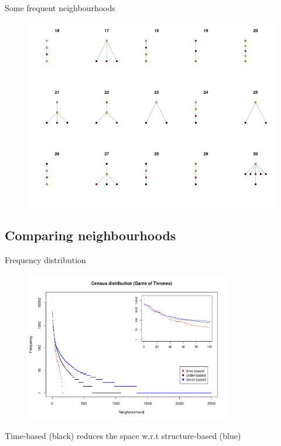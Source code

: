 \documentclass{beamer}
\begin{document}
\begin{frame}{Some frequent neighbourhoods}{}
	\begin{figure}
		\centering
		\includegraphics[width=1\textwidth]{dictionary2}
	\end{figure}
\end{frame}

\subsection{Comparing neighbourhoods}
\begin{frame}{Frequency distribution}{}
	\begin{figure}
		\centering
		\includegraphics[width=0.8\textwidth]{compare_census_distribution}
	\end{figure}
Time-based (black) reduces the space w.r.t structure-based (blue)
\end{frame}
\end{document}
